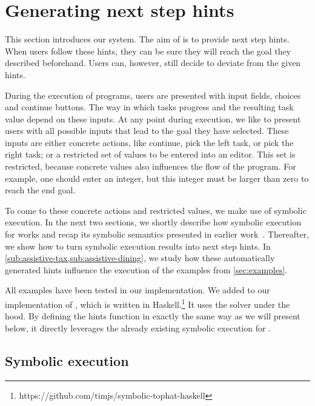 
\section{Generating next step hints}
\label{sec:assistive}

This section introduces our \ASTOPHAT system.
The aim of \ASTOPHAT is to provide next step hints.
When users follow these hints, they can be sure they will reach the goal they described beforehand.
Users can, however, still decide to deviate from the given hints.

During the execution of \TOPHAT programs, users are presented with input fields, choices and continue buttons.
The way in which tasks progress and the resulting task value depend on these inputs.
At any point during execution, we like to present users with all possible inputs that lead to the goal they have selected.
These inputs are either concrete actions, like continue, pick the left task, or pick the right task;
or a restricted set of values to be entered into an editor.
This set is restricted, because concrete values also influences the flow of the program.
For example, one should enter an integer, but this integer must be larger than zero to reach the end goal.

To come to these concrete actions and restricted values, we make use of symbolic execution.
In the next two sections, we shortly describe how symbolic execution for \TOPHAT works
and recap its symbolic semantics presented in earlier work~\cite{Naus2019}.
Thereafter, we show how to turn symbolic execution results into next step hints.
In \cref{sub:assistive-tax,sub:assistive-dining}, we study how these automatically generated hints influence the execution of the examples from \cref{sec:examples}.

All examples have been tested in our implementation.
We added \ASTOPHAT to our implementation of \STOPHAT, which is written in Haskell.\footnote{https://github.com/timjs/symbolic-tophat-haskell}
It uses the \ZTHREE \SMT solver under the hood.
By defining the hints function in exactly the same way as we will present below, %
it directly leverages the already existing symbolic execution for \STOPHAT.


\subsection{Symbolic execution}
\label{sub:symbolic-execution}

